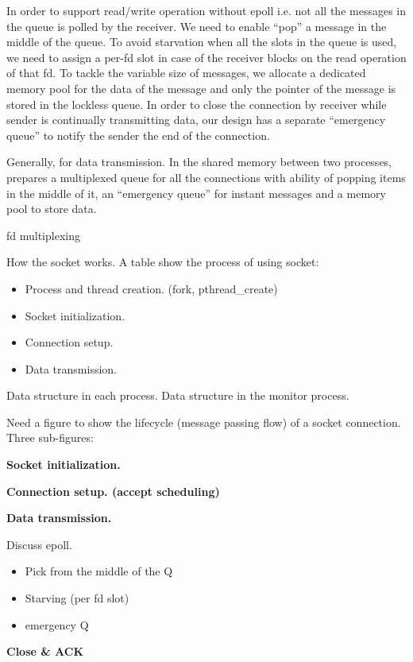 In order to support read/write operation without epoll i.e. not all the messages in the queue is polled by the receiver. We need to enable ``pop'' a message in the middle of the queue. To avoid starvation when all the slots in the queue is used, we need to assign a per-fd slot in case of the receiver blocks on the read operation of that fd. To tackle the variable size of messages, we allocate a dedicated memory pool for the data of the message and only the pointer of the message is stored in the lockless queue. In order to close the connection by receiver while sender is continually transmitting data, our design has a separate ``emergency queue'' to notify the sender the end of the connection.

Generally, for data transmission. In the shared memory between two processes, \libipc prepares a multiplexed queue for all the connections with ability of popping items in the middle of it, an ``emergency queue'' for instant messages and a memory pool to store data.

fd multiplexing

How the socket works. A table show the process of using socket:

\begin{itemize}
	\item Process and thread creation. (fork, pthread\_create)
	\item Socket initialization.
	\item Connection setup.
	\item Data transmission.
\end{itemize}


Data structure in each process. Data structure in the monitor process.

Need a figure to show the lifecycle (message passing flow) of a socket connection. Three sub-figures:


	 \textbf{Socket initialization.}
	  
	 \textbf{Connection setup. (accept scheduling)}
	 
	 \textbf{Data transmission.}
	 
	 Discuss epoll.
\begin{itemize}
	\item Pick from the middle of the Q
	\item Starving (per fd slot)
	\item emergency Q
\end{itemize}

    \textbf{Close \& ACK}


